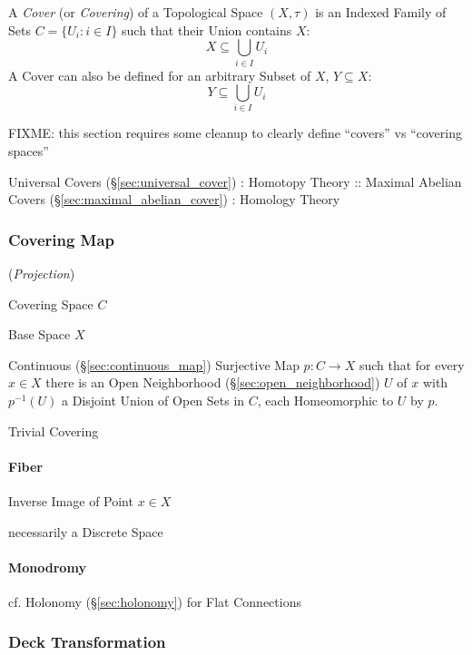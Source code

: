 A \emph{Cover} (or \emph{Covering}) of a Topological Space $(X, \tau)$
is an Indexed Family of Sets $C = \{ U_i : i \in I \}$ such that their
Union contains $X$:
\[
  X \subseteq \bigcup_{i \in I} U_i
\]
A Cover can also be defined for an arbitrary Subset of $X$, $Y
\subseteq X$:
\[
  Y \subseteq \bigcup_{i \in I} U_i
\]

FIXME: this section requires some cleanup to clearly define ``covers''
vs ``covering spaces''

Universal Covers (\S\ref{sec:universal_cover}) : Homotopy Theory ::
Maximal Abelian Covers (\S\ref{sec:maximal_abelian_cover}) : Homology
Theory



\subsubsection{Covering Map}\label{sec:covering_map}

(\emph{Projection})

Covering Space $C$

Base Space $X$

Continuous (\S\ref{sec:continuous_map}) Surjective Map $p : C
\rightarrow X$ such that for every $x \in X$ there is an Open
Neighborhood (\S\ref{sec:open_neighborhood}) $U$ of $x$ with
$p^{-1}(U)$ a Disjoint Union of Open Sets in $C$, each Homeomorphic to
$U$ by $p$.

Trivial Covering



\paragraph{Fiber}\label{sec:point_fiber}\hfill

Inverse Image of Point $x \in X$

necessarily a Discrete Space



\paragraph{Monodromy}\label{sec:monodromy}\hfill

\fist cf. Holonomy (\S\ref{sec:holonomy}) for Flat Connections



\subsubsection{Deck Transformation}\label{sec:deck_transformation}

